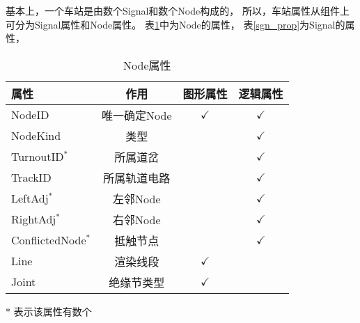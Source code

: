 基本上，一个车站是由数个Signal和数个Node构成的，
所以，车站属性从组件上可分为Signal属性和Node属性。
表\ref{node_prop}中为Node的属性，
表\ref{sgn_prop}为Signal的属性，
\newcommand{\yes}{$\checkmark$}
\begin{table}[htpb!]
    \centering
    \caption{\label{node_prop}Node属性}
    \begin{threeparttable}
        \begin{tabular}{lccc}
            \toprule
            属性               & 作用         & 图形属性 & 逻辑属性 \\
            \midrule
            NodeID             & 唯一确定Node & \yes     & \yes     \\
            NodeKind           & 类型         &          & \yes     \\
            TurnoutID$^*$      & 所属道岔     &          & \yes     \\
            TrackID            & 所属轨道电路 &          & \yes     \\
            LeftAdj$^*$        & 左邻Node     &          & \yes     \\
            RightAdj$^*$       & 右邻Node     &          & \yes     \\
            ConflictedNode$^*$ & 抵触节点     &          & \yes     \\
            Line               & 渲染线段     & \yes     &          \\
            Joint              & 绝缘节类型   & \yes     &          \\
            \bottomrule
        \end{tabular}

        \begin{tablenotes}
            \footnotesize
            \item[$*$] 表示该属性有数个
        \end{tablenotes}
    \end{threeparttable}

\end{table}

